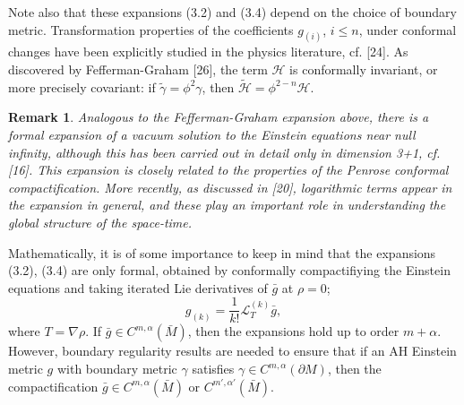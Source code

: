 \documentclass[11pt,amsfonts]{amsart}
\newtheorem{remark}[theorem]{Remark}
\begin{document}
  Note also that these expansions (3.2) and (3.4) depend on the choice 
of boundary metric. Transformation properties of the coefficients $g_{(i)}$, 
$i \leq n$, under conformal changes have been explicitly studied in the physics 
literature, cf. [24]. As discovered by Fefferman-Graham [26], the term 
${\mathcal H}$ is conformally invariant, or more precisely covariant: 
if $\widetilde \gamma = \phi^{2}\gamma$, then $\widetilde {\mathcal H} = 
\phi^{2-n} {\mathcal H}$. 

\begin{remark} \label{r3.1}
{\rm Analogous to the Fefferman-Graham expansion above, there is a 
formal expansion of a vacuum solution to the Einstein equations near 
null infinity, although this has been carried out in detail only in 
dimension 3+1, cf. [16]. This expansion is closely related to the 
properties of the Penrose conformal compactification. More recently, 
as discussed in [20], logarithmic terms appear in the expansion 
in general, and these play an important role in understanding the 
global structure of the space-time. }

\end{remark}

 Mathematically, it is of some importance to keep in mind that the 
expansions (3.2), (3.4) are only formal, obtained by conformally 
compactifiying the Einstein equations and taking iterated Lie derivatives 
of $\bar g$ at $\rho = 0$;
\begin{equation} \label{e3.6}
g_{(k)} = \frac{1}{k!}{\mathcal L}_{T}^{(k)}\bar g, 
\end{equation}
where $T = \nabla\rho$. If $\bar g \in  C^{m,\alpha}(\bar M)$, 
then the expansions hold up to order $m+\alpha$. However, boundary 
regularity results are needed to ensure that if an AH Einstein metric 
$g$ with boundary metric $\gamma$ satisfies $\gamma  \in  
C^{m,\alpha}(\partial M)$, then the compactification $\bar g \in  
C^{m,\alpha}(\bar M)$ or $C^{m',\alpha'}(\bar M)$. 
\end{document}
